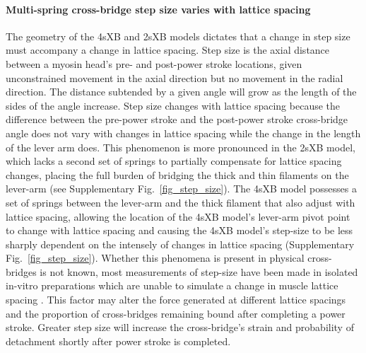 \documentclass[]{article}
\begin{document}
\paragraph{Multi-spring cross-bridge step size varies with lattice spacing} %
The geometry of the 4sXB and 2sXB models dictates that a change in step size must accompany a change in lattice spacing. 
Step size is the axial distance between a myosin head's pre- and post-power stroke locations, given unconstrained movement in the axial direction but no movement in the radial direction. 
The distance subtended by a given angle will grow as the length of the sides of the angle increase. 
Step size changes with lattice spacing because the difference between the pre-power stroke and the post-power stroke cross-bridge angle does not vary with changes in lattice spacing while the change in the length of the lever arm does. 
This phenomenon is more pronounced in the 2sXB model, which lacks a second set of springs to partially compensate for lattice spacing changes, placing the full burden of bridging the thick and thin filaments on the lever-arm (see Supplementary Fig.~\ref{fig_step_size}). 
The 4sXB model possesses a set of springs between the lever-arm and the thick filament that also adjust with lattice spacing, allowing the location of the 4sXB model's lever-arm pivot point to change with lattice spacing and causing the 4sXB model's step-size to be less sharply dependent on the intensely of changes in lattice spacing (Supplementary Fig.~\ref{fig_step_size}).  
Whether this phenomena is present in physical cross-bridges is not known, most measurements of step-size have been made in isolated in-vitro preparations which are unable to simulate a change in muscle lattice spacing \citep{HowardBook, Peterman2004}.  
This factor may alter the force generated at different lattice spacings and the proportion of cross-bridges remaining bound after completing a power stroke.
Greater step size will increase the cross-bridge's strain and probability of detachment shortly after power stroke is completed. 
\end{document}
